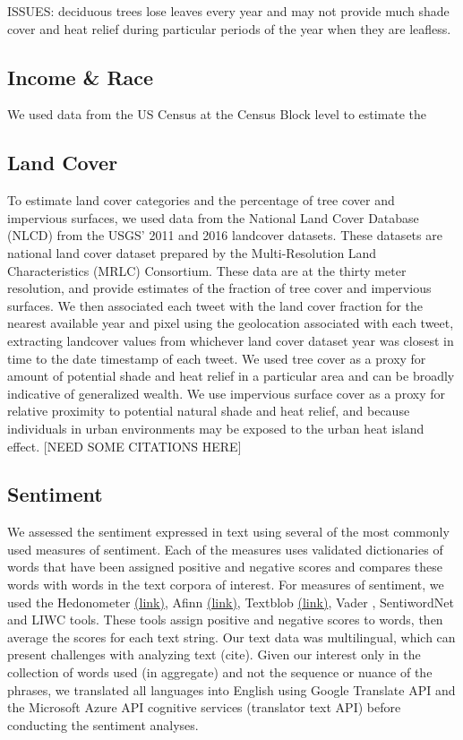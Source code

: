 \documentclass{article}
\begin{document}
ISSUES: deciduous trees lose leaves every year and may not provide much shade cover and heat relief during particular periods of the year when they are leafless.

\subsection{Income \& Race}
We used data from the US Census at the Census Block level to estimate the 

\subsection{Land Cover}
To estimate land cover categories and the percentage of tree cover and impervious surfaces, we used data from the National Land Cover Database (NLCD) from the USGS' 2011  \cite{homer_completion_2015} and 2016 \cite{yang_new_2018} landcover datasets. These datasets are national land cover dataset prepared by the Multi-Resolution Land Characteristics (MRLC) Consortium.  These data are at the thirty meter resolution, and provide estimates of the fraction of tree cover and impervious surfaces.  We then associated each tweet with the land cover fraction for the nearest available year and pixel using the geolocation associated with each tweet, extracting landcover values from whichever land cover dataset year was closest in time to the date timestamp of each tweet. We used tree cover as a proxy for amount of potential shade and heat relief in a particular area and can be broadly indicative of generalized wealth. We use impervious surface cover as a proxy for relative proximity to potential natural shade and heat relief, and because individuals in urban environments may be exposed to the urban heat island effect. [NEED SOME CITATIONS HERE] 

\subsection{Sentiment}
We assessed the sentiment expressed in text using several of the most commonly used measures of sentiment. Each of the measures uses validated dictionaries of words that have been assigned positive and negative scores and compares these words with words in the text corpora of interest. For measures of sentiment, we used the Hedonometer \href{https://hedonometer.org/timeseries/en_all/}{(link)}, Afinn \href{http://corpustext.com/reference/sentiment_afinn.html}{(link)}, Textblob \href{https://textblob.readthedocs.io/en/dev/}{(link)}, Vader , SentiwordNet and LIWC tools. These tools assign positive and negative scores to words, then average the scores for each text string. Our text data was multilingual, which can present challenges with analyzing text (cite). Given our interest only in the collection of words used (in aggregate) and not the sequence or nuance of the phrases, we translated all languages into English using Google Translate API and the Microsoft Azure API cognitive services (translator text API) before conducting the sentiment analyses.
\end{document}
